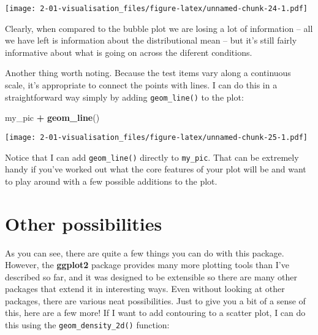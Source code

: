 \documentclass[]{book}
\newenvironment{Shaded}{\begin{snugshade}}{\end{snugshade}}
\newcommand{\DataTypeTok}[1]{\textcolor[rgb]{0.13,0.29,0.53}{#1}}
\newcommand{\DecValTok}[1]{\textcolor[rgb]{0.00,0.00,0.81}{#1}}
\newcommand{\KeywordTok}[1]{\textcolor[rgb]{0.13,0.29,0.53}{\textbf{#1}}}
\newcommand{\NormalTok}[1]{#1}
\newcommand{\OperatorTok}[1]{\textcolor[rgb]{0.81,0.36,0.00}{\textbf{#1}}}
\newcommand{\StringTok}[1]{\textcolor[rgb]{0.31,0.60,0.02}{#1}}
\begin{document}
\texttt{[image: 2-01-visualisation\_files/figure-latex/unnamed-chunk-24-1.pdf]}

Clearly, when compared to the bubble plot we are losing a lot of information -- all we have left is information about the distributional mean -- but it's still fairly informative about what is going on across the diferent conditions.

Another thing worth noting. Because the test items vary along a continuous scale, it's appropriate to connect the points with lines. I can do this in a straightforward way simply by adding \texttt{geom\_line()} to the plot:

\begin{Shaded}
\begin{Highlighting}[]
\NormalTok{my_pic }\OperatorTok{+}\StringTok{ }\KeywordTok{geom_line}\NormalTok{()}
\end{Highlighting}
\end{Shaded}

\texttt{[image: 2-01-visualisation\_files/figure-latex/unnamed-chunk-25-1.pdf]}

Notice that I can add \texttt{geom\_line()} directly to \texttt{my\_pic}. That can be extremely handy if you've worked out what the core features of your plot will be and want to play around with a few possible additions to the plot.

\hypertarget{other-possibilities}{%
\section{Other possibilities}\label{other-possibilities}}

As you can see, there are quite a few things you can do with this package. However, the \textbf{ggplot2} package provides many more plotting tools than I've described so far, and it was designed to be extensible so there are many other packages that extend it in interesting ways. Even without looking at other packages, there are various neat possibilities. Just to give you a bit of a sense of this, here are a few more! If I want to add contouring to a scatter plot, I can do this using the \texttt{geom\_density\_2d()} function:

\begin{Shaded}
\end{Shaded}
\end{document}
